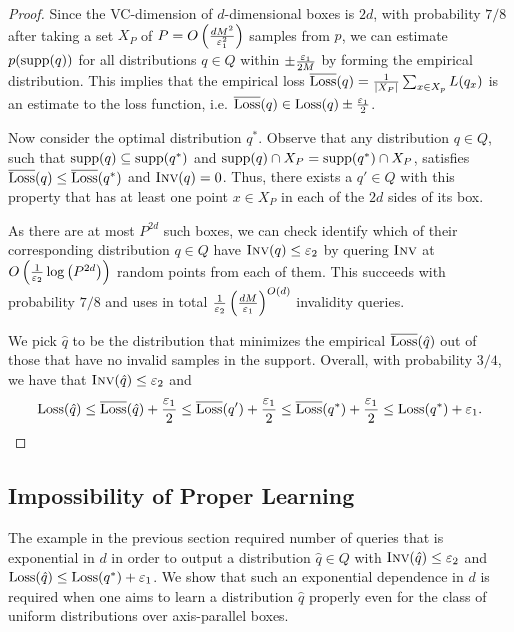 \begin{proof}
  Since the VC-dimension of $d$-dimensional boxes is $2 d$, with probability $7/8$ after taking a set $X_P$ of $P = O\left(\frac {d M^2} {\varepsilon_1^2} \right)$ samples from $p$, we can estimate 
  $p(\text{supp}(q))$ for all distributions $q \in Q$ within $\pm \frac {\varepsilon_1} {2 M}$ by forming the empirical distribution. This implies that the empirical loss $\overline {\text{Loss}}(q) = \frac 1 { |X_P| } \sum_{x \in X_p} L(q_x)$ is an estimate to the loss function, i.e. $\overline {\text{Loss}}(q) \in \text{Loss}(q)\pm \frac {\varepsilon_1} {2}$.
  
  Now consider the optimal distribution $q^*$. Observe that any distribution $q \in Q$, such that $\text{supp}(q) \subseteq \text{supp}(q^*)$ and $\text{supp}(q)\cap X_P = \text{supp}(q^*)\cap X_P$, satisfies $\overline {\text{Loss}}(q) \le \overline {\text{Loss}}(q^*)$ and $\textsc{Inv}(q)=0$. Thus, there exists a $q'\in Q$ with this property that has at least one point $x \in X_P$ in each of the $2 d$ sides of its box.
  
  As there are at most $P^{2 d}$ such boxes, we can check identify which of their corresponding distribution $q \in Q$ have $\textsc{Inv}(q) \le \varepsilon_2$ by quering $\textsc{Inv}$ at $O\left( \frac 1 {\varepsilon_2} \log \left( P^{2 d} \right) \right)$ random points from each of them. This succeeds with probability $7/8$ and uses in total 
  $\frac {1} {\varepsilon_2} \left(\frac {d M} {\varepsilon_1} \right)^{O( d )}$ 
  invalidity queries. 
  
  We pick $\hat q$ to be the distribution that minimizes the empirical $\overline {\text{Loss}}(\hat q)$ out of those that have no invalid samples in the support.
  Overall, with probability $3/4$, we have that $\textsc{Inv}(\hat q) \le \varepsilon_2$ and
  $$
    \text{Loss}(\hat q) \le \overline {\text{Loss}}(\hat q) + \frac {\varepsilon_1} 2 
    \le \overline {\text{Loss}}(q') + \frac {\varepsilon_1} 2 
    \le \overline {\text{Loss}}(q^*) + \frac {\varepsilon_1} 2
    \le \text{Loss}(q^*) + {\varepsilon_1}.
$$
\end{proof}

\subsection{Impossibility of Proper Learning}\label{sec:impossibility}

The example in the previous section required number of queries that is exponential in $d$ in order to output a distribution $\hat q \in Q$ with $\textsc{Inv}(\hat q) \le \varepsilon_2$ and $\text{Loss}(\hat q) \le \text{Loss}(q^*) + \varepsilon_1$. 
We show that such an exponential dependence in $d$ is required when one aims to learn a distribution $\hat q$ properly even for the class of uniform distributions over axis-parallel boxes.

